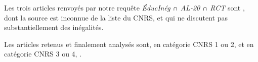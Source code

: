 \documentclass[pagesize, twoside=off, bibliography=totoc, DIV=calc, fontsize=12pt, a4paper, french]{scrartcl}
\begin{document}
Les trois articles renvoyés par notre requête \emph{ÉducInég ∩ AL-20 ∩ RCT} sont \citet{balsa_randomized_2016}, dont la source est inconnue de la liste du CNRS, et \citet{cristia_technology_2012, frisancho_impact_2020} qui ne discutent pas substantiellement des inégalités.

Les articles retenus et finalement analysés sont, en catégorie CNRS 1 ou 2, \citet{albertus_land_2020,arabsheibani_changes_2006,bravo_effects_2010,bursztyn_poverty_2016,ferreira_rise_2008,frisancho_impact_2020,levy_latin_2013,messina_twenty_2020,psacharopoulos_poverty_1995,resende_simulating_2021,staab_putting_2011} et en catégorie CNRS 3 ou 4, \citet{berthelon_school_2023,birdsall_education_1998,carlson_education_2002,cavalcanti_barriers_2010,mejia-guevara_intergenerational_2024,trejos_inequality_2004,urbina_intergenerational_2018}.

% 

\end{document}
